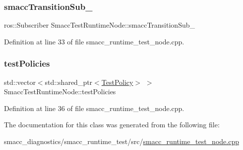 \subsubsection{\texorpdfstring{smacc\+Transition\+Sub\+\_\+}{smaccTransitionSub\_}}
{\footnotesize\ttfamily ros\+::\+Subscriber Smacc\+Test\+Runtime\+Node\+::smacc\+Transition\+Sub\+\_\+}



Definition at line 33 of file smacc\+\_\+runtime\+\_\+test\+\_\+node.\+cpp.

\mbox{\label{classSmaccTestRuntimeNode_a099952c0249a6f4f94469d991a644b69}} 
\subsubsection{\texorpdfstring{test\+Policies}{testPolicies}}
{\footnotesize\ttfamily std\+::vector$<$std\+::shared\+\_\+ptr$<$\hyperlink{classTestPolicy}{Test\+Policy}$>$ $>$ Smacc\+Test\+Runtime\+Node\+::test\+Policies}



Definition at line 36 of file smacc\+\_\+runtime\+\_\+test\+\_\+node.\+cpp.



The documentation for this class was generated from the following file\+:\begin{DoxyCompactItemize}
\item 
smacc\+\_\+diagnostics/smacc\+\_\+runtime\+\_\+test/src/\hyperlink{smacc__runtime__test__node_8cpp}{smacc\+\_\+runtime\+\_\+test\+\_\+node.\+cpp}\end{DoxyCompactItemize}
